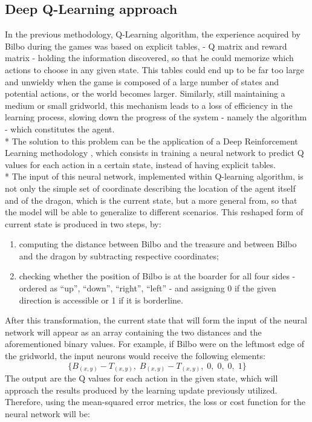 \subsection{Deep Q-Learning approach}
In the previous methodology, Q-Learning algorithm, the experience acquired by Bilbo during the games was based on explicit tables, - Q matrix and reward matrix - holding the information discovered, so that he could memorize which actions to choose in any given state. This tables could end up to be far too large and unwieldy when the game is composed of a large number of states and potential actions, or the world becomes larger. Similarly, still maintaining a medium or small gridworld, this mechanism leads to a loss of efficiency in the learning process, slowing down the progress of the system - namely the algorithm - which constitutes the agent.\\*
The solution to this problem can be the application of a Deep Reinforcement Learning methodology \cite{3,5,6}, which consists in training a neural network to predict Q values for each action in a certain state, instead of having explicit tables.\\*
The input of this neural network, implemented within Q-learning algorithm, is not only the simple set of coordinate describing the location of the agent itself and of the dragon, which is the current state, but a more general from, so that the model will be able to generalize to different scenarios. This reshaped form of current state is produced in two steps, by:
\begin{enumerate}
  \item computing the distance between Bilbo and the treasure and between Bilbo and the dragon by subtracting respective coordinates;
  \item checking whether the position of Bilbo is at the boarder  for all four sides - ordered as ``up'', ``down'', ``right'', ``left'' - and assigning 0 if the given direction is accessible or 1 if it is borderline.
\end{enumerate}
After this transformation, the current state that will form the input of the neural network will appear as an array containing the two distances and the aforementioned binary values. For example, if Bilbo were on the leftmost edge of the gridworld, the input neurons would receive the following elements:
$$
\{B_{(x,y)}-T_{(x,y)},\;B_{(x,y)}-T_{(x,y)},\;0,\;0,\;0,\;1\}
$$
The output are the Q values for each action in the given state, which will approach the results produced by the learning update previously utilized. Therefore, using the mean-squared error metrics, the loss or cost function for the neural network will be:
